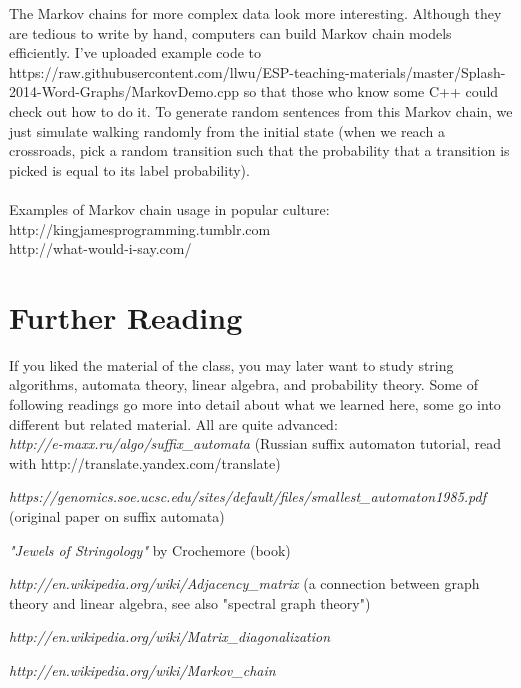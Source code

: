 \documentclass[12pt]{article}
\begin{document}
The Markov chains for more complex data look more interesting. Although they are tedious to write by hand, computers can build Markov chain models efficiently. I've uploaded example code to https://raw.githubusercontent.com/llwu/ESP-teaching-materials/master/Splash-2014-Word-Graphs/MarkovDemo.cpp so that those who know some C++ could check out how to do it. To generate random sentences from this Markov chain, we just simulate walking randomly from the initial state (when we reach a crossroads, pick a random transition such that the probability that a transition is picked is equal to its label probability). \\ \\
Examples of Markov chain usage in popular culture: \\
http://kingjamesprogramming.tumblr.com \\
http://what-would-i-say.com/

\section{Further Reading}
If you liked the material of the class, you may later want to study string algorithms, automata theory, linear algebra, and probability theory. Some of following readings go more into detail about what we learned here, some go into different but related material. All are quite advanced: \\

\textit{http://e-maxx.ru/algo/suffix\_automata} (Russian suffix automaton tutorial, read with http://translate.yandex.com/translate)

\textit{https://genomics.soe.ucsc.edu/sites/default/files/smallest\_automaton1985.pdf} (original paper on suffix automata)

\textit{"Jewels of Stringology"} by Crochemore (book)

\textit{http://en.wikipedia.org/wiki/Adjacency\_matrix} (a connection between graph theory and linear algebra, see also "spectral graph theory")

\textit{http://en.wikipedia.org/wiki/Matrix\_diagonalization}

\textit{http://en.wikipedia.org/wiki/Markov\_chain}
\end{document}
